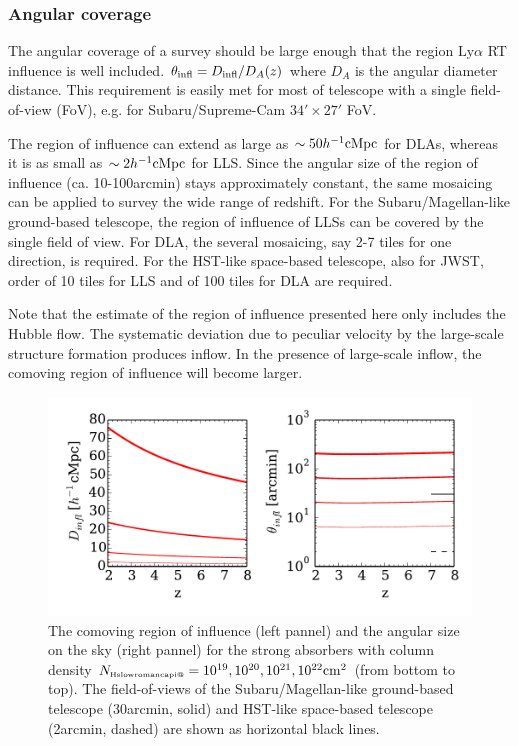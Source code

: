 \documentclass[useAMS,usenatbib,twocolumn]{mn2e}
\makeatletter
\newcommand{\Rmnum}[1]{\expandafter\@slowromancap\romannumeral #1@}
\newcommand{\LyA}{\mbox{Ly}\alpha}
\newcommand{\NHI}{N_{\mbox{\tiny H\Rmnum{1}}}}
\makeatother
\begin{document}
\subsubsection{Angular coverage}
The angular coverage of a survey should be large enough that the region
$\LyA$ RT influence is well included. $\theta_{\rm{infl}}=D_{\rm{infl}}/D_A(z)$
where $D_A$ is the angular diameter distance. This requirement is easily
met for most of telescope with a single field-of-view (FoV), e.g.
for Subaru/Supreme-Cam $34'\times27'$ FoV.

The region of influence can extend as large as $\sim50h^{-1}\rm{cMpc}$ for
DLAs, whereas it is as small as $\sim2h^{-1}\rm{cMpc}$ for LLS. Since the 
angular size of the region of influence (ca. 10-100arcmin) stays approximately 
constant, the same mosaicing can be applied to survey the wide range of redshift.
For the Subaru/Magellan-like ground-based telescope, the region of influence of
LLSs can be covered by the single field of view. For DLA, the several mosaicing,
say 2-7 tiles for one direction, is required. For the HST-like space-based telescope, 
also for JWST, order of 10 tiles for LLS and of 100 tiles for DLA are required.

Note that the estimate of the region of influence presented here only includes 
the Hubble flow. The systematic deviation due to peculiar velocity by the large-scale
structure formation produces inflow. In the presence of large-scale inflow,
the comoving region of influence will become larger.
 
\begin{figure}
 \begin{center}
  \includegraphics[angle=0,width=\columnwidth]{figure/region_of_influence.pdf}
  \caption{The comoving region of influence (left pannel) and the angular size on the sky 
  (right pannel) for the strong absorbers with column density 
  $\NHI=10^{19},10^{20},10^{21},10^{22}\rm{cm}^2$
  (from bottom to top). The field-of-views of the Subaru/Magellan-like ground-based 
  telescope (30arcmin, solid) and HST-like space-based telescope (2arcmin, dashed) 
  are shown as horizontal black lines.}
 \end{center}
\end{figure}
\end{document}

